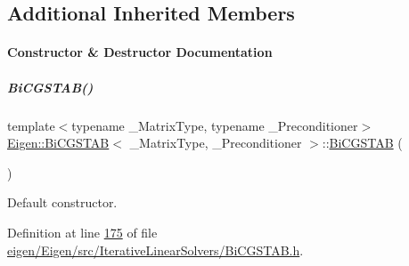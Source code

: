 \subsection*{Additional Inherited Members}


\paragraph{Constructor \& Destructor Documentation}
\mbox{\label{group___iterative_linear_solvers___module_ae1a0df6ef6e947256c3cb83ce7df7eda}} 
\subparagraph{\texorpdfstring{Bi\+C\+G\+S\+T\+A\+B()}{BiCGSTAB()}\hspace{0.1cm}{\footnotesize\ttfamily [1/4]}}
{\footnotesize\ttfamily template$<$typename \+\_\+\+Matrix\+Type, typename \+\_\+\+Preconditioner$>$ \\
\hyperlink{group___iterative_linear_solvers___module_class_eigen_1_1_bi_c_g_s_t_a_b}{Eigen\+::\+Bi\+C\+G\+S\+T\+AB}$<$ \+\_\+\+Matrix\+Type, \+\_\+\+Preconditioner $>$\+::\hyperlink{group___iterative_linear_solvers___module_class_eigen_1_1_bi_c_g_s_t_a_b}{Bi\+C\+G\+S\+T\+AB} (\begin{DoxyParamCaption}{ }\end{DoxyParamCaption})\hspace{0.3cm}{\ttfamily [inline]}}

Default constructor. 

Definition at line \hyperlink{eigen_2_eigen_2src_2_iterative_linear_solvers_2_bi_c_g_s_t_a_b_8h_source_l00175}{175} of file \hyperlink{eigen_2_eigen_2src_2_iterative_linear_solvers_2_bi_c_g_s_t_a_b_8h_source}{eigen/\+Eigen/src/\+Iterative\+Linear\+Solvers/\+Bi\+C\+G\+S\+T\+A\+B.\+h}.

